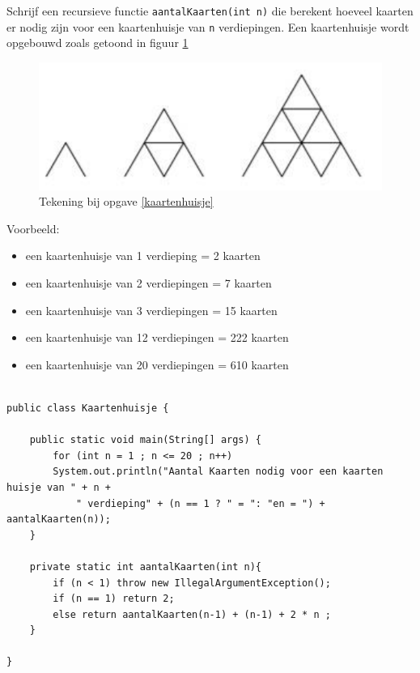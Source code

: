 \begin{oef}\label{kaartenhuisje}
\code Schrijf een recursieve functie \verb/aantalKaarten(int n)/ die berekent hoeveel kaarten er nodig zijn voor een kaartenhuisje van \verb/n/ verdiepingen. Een kaartenhuisje wordt opgebouwd zoals getoond in figuur \ref{fig:kaartenhuisje}
\begin{figure}[H]
\centering
\includegraphics{fig/kaartenhuisje.png}
\caption{Tekening bij opgave \ref{kaartenhuisje}}
\label{fig:kaartenhuisje}
\end{figure}
Voorbeeld: 
\begin{itemize}
\item een kaartenhuisje van 1 verdieping = 2 kaarten
\item een kaartenhuisje van 2 verdiepingen = 7  kaarten
\item een kaartenhuisje van 3 verdiepingen = 15 kaarten
\item een kaartenhuisje van 12 verdiepingen = 222 kaarten
\item een kaartenhuisje van 20 verdiepingen = 610 kaarten
\end{itemize}

\begin{opl}
\begin{lstlisting}[caption={Aantal kaarten nodig om een kaartenhuisje te maken}, label=reckaartenHuisje]

public class Kaartenhuisje {

	public static void main(String[] args) {
		for (int n = 1 ; n <= 20 ; n++)
		System.out.println("Aantal Kaarten nodig voor een kaarten huisje van " + n + 
			" verdieping" + (n == 1 ? " = ": "en = ") + aantalKaarten(n));
	}
	
	private static int aantalKaarten(int n){
		if (n < 1) throw new IllegalArgumentException();
		if (n == 1) return 2;
		else return aantalKaarten(n-1) + (n-1) + 2 * n ;
	}

}
\end{lstlisting}

\end{opl}

\end{oef}


\vspace*{\fill}
